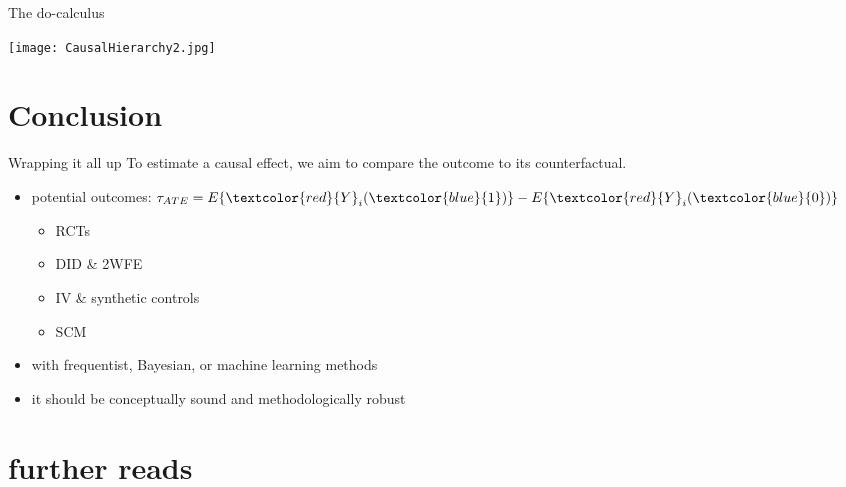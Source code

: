 \documentclass[aspectratio=169]{beamer}
\begin{document}
		\begin{frame}{The do-calculus}
			\begin{center}
				\texttt{[image: CausalHierarchy2.jpg]}
			\end{center}
		\end{frame}

\section{Conclusion}

	\begin{frame}{Wrapping it all up}
		To estimate a causal effect, we aim to compare the outcome to its counterfactual.
		\begin{itemize}
			\item<1-> potential outcomes: $ \tau_{ATE}  =  E \{\textcolor{red}{Y}_i(\textcolor{blue}{1})\} - E \{\textcolor{red}{Y}_i(\textcolor{blue}{0})\} $
			\begin{itemize}
				\item<2-> RCTs
				\item<2-> DID \& 2WFE
				\item<2-> IV \& synthetic controls
				\item<2->	SCM
			\end{itemize}
			\item<3-> with frequentist, Bayesian, or machine learning methods
			\item<4-> it should be conceptually sound and methodologically robust
		\end{itemize}
	\end{frame}

\section{further reads}
\end{document}
